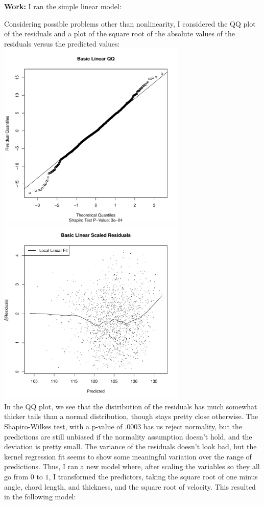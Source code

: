 \documentclass[11pt]{article}
\theoremstyle{definition}
\begin{document}
\begin{itemize}
\begin{itemize}
                {\bf Work:} I ran the simple linear model:
                
                Considering possible problems other than nonlinearity, I considered the QQ plot of the residuals and a plot of the square root of the absolute values of the residuals versus the predicted values: \\ 
                \includegraphics[width=9cm]{final/1a_qq} 
                \includegraphics[width=9cm]{final/1a_sqrt_res_plot} \\ 
                In the QQ plot, we see that the distribution of the residuals has much somewhat thicker tails than a normal distribution, though stays pretty close otherwise. The Shapiro-Wilkes test, with a p-value of $.0003$ has us reject normality, but the predictions are still unbiased if the normality assumption doesn't hold, and the deviation is pretty small. The variance of the residuals doesn't look bad, but the kernel regression fit seems to show some meaningful variation over the range of predictions. Thus, I ran a new model where, after scaling the variables so they all go from $0$ to $1$, I transformed the predictors, taking the square root of one minus angle, chord length, and thickness, and the square root of velocity. This resulted in the following model: \\

\end{itemize}
\end{itemize}
\end{document}
